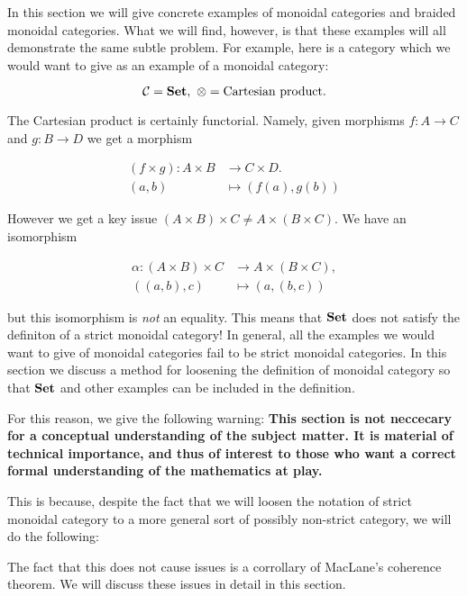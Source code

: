In this section we will give concrete examples of monoidal categories and braided monoidal categories. What we will find, however, is that these examples will all demonstrate the same subtle problem. For example, here is a category which we would want to give as an example of a monoidal category:

$${\mathcal C}={\bf Set},\,\, \otimes = \text{Cartesian product}.$$

The Cartesian product is certainly functorial. Namely, given morphisms $f:A\to C$ and $g:B\to D$ we get a morphism

\begin{align*}
(f\times g): A\times B &\xrightarrow{} C\times D.\\
(a,b)&\mapsto (f(a), g(b))
\end{align*}

However we get a key issue $(A\times B)\times C \neq A\times (B\times C)$. We have an isomorphism

\begin{align*}
\alpha : (A\times B )\times C &\xrightarrow{} A \times (B\times C),\\
((a,b),c)&\mapsto (a,(b,c))
\end{align*}

but this isomorphism is {\em not} an equality. This means that ${\bf Set}$ does not satisfy the definiton of a strict monoidal category! In general, all the examples we would want to give of monoidal categories fail to be strict monoidal categories. In this section we discuss a method for loosening the definition of monoidal category so that ${\bf Set}$ and other examples can be included in the definition.

For this reason, we give the following warning: \textbf{This section is not neccecary for a conceptual understanding of the subject matter. It is material of technical importance, and thus of interest to those who want a correct formal understanding of the mathematics at play.}

This is because, despite the fact that we will loosen the notation of strict monoidal category to a more general sort of possibly non-strict category, we will do the following:

\begin{center}
\end{center}

The fact that this does not cause issues is a corrollary of MacLane's coherence theorem. We will discuss these issues in detail in this section.

